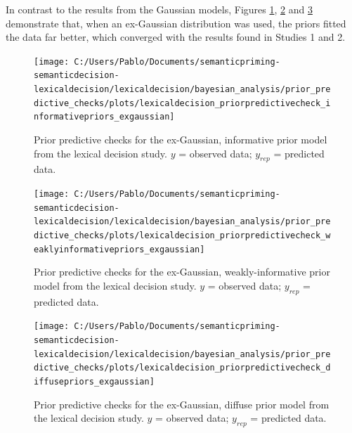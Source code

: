 \documentclass[
  12pt,
  man,floatsintext]{apa7}
\begin{document}
In contrast to the results from the Gaussian models, Figures \ref{fig:lexicaldecision-priorpredictivecheck-informativepriors-exgaussian}, \ref{fig:lexicaldecision-priorpredictivecheck-weaklyinformativepriors-exgaussian} and \ref{fig:lexicaldecision-priorpredictivecheck-diffusepriors-exgaussian} demonstrate that, when an ex-Gaussian distribution was used, the priors fitted the data far better, which converged with the results found in Studies 1 and 2.



\begin{figure}

{\centering \texttt{[image: C:/Users/Pablo/Documents/semanticpriming-semanticdecision-lexicaldecision/lexicaldecision/bayesian\_analysis/prior\_predictive\_checks/plots/lexicaldecision\_priorpredictivecheck\_informativepriors\_exgaussian]} 

}

\caption{Prior predictive checks for the ex-Gaussian, informative prior model from the lexical decision study. \(y\) = observed data; \(y_{rep}\) = predicted data.}\label{fig:lexicaldecision-priorpredictivecheck-informativepriors-exgaussian}
\end{figure}



\begin{figure}

{\centering \texttt{[image: C:/Users/Pablo/Documents/semanticpriming-semanticdecision-lexicaldecision/lexicaldecision/bayesian\_analysis/prior\_predictive\_checks/plots/lexicaldecision\_priorpredictivecheck\_weaklyinformativepriors\_exgaussian]} 

}

\caption{Prior predictive checks for the ex-Gaussian, weakly-informative prior model from the lexical decision study. \(y\) = observed data; \(y_{rep}\) = predicted data.}\label{fig:lexicaldecision-priorpredictivecheck-weaklyinformativepriors-exgaussian}
\end{figure}



\begin{figure}

{\centering \texttt{[image: C:/Users/Pablo/Documents/semanticpriming-semanticdecision-lexicaldecision/lexicaldecision/bayesian\_analysis/prior\_predictive\_checks/plots/lexicaldecision\_priorpredictivecheck\_diffusepriors\_exgaussian]} 

}

\caption{Prior predictive checks for the ex-Gaussian, diffuse prior model from the lexical decision study. \(y\) = observed data; \(y_{rep}\) = predicted data.}\label{fig:lexicaldecision-priorpredictivecheck-diffusepriors-exgaussian}
\end{figure}
\end{document}
